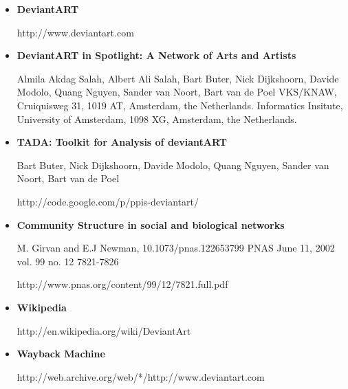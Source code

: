 \documentclass[12pt,a4paper]{report}
\begin{document}
\begin{itemize}

\item \textbf{DeviantART} 

http://www.deviantart.com 

\item \textbf{DeviantART in Spotlight: A Network of Arts and Artists }

Almila Akdag Salah, Albert Ali Salah, Bart Buter, Nick Dijkshoorn, Davide Modolo, Quang Nguyen, Sander van Noort, Bart van de Poel VKS/KNAW, Cruiquisweg 31, 1019 AT, Amsterdam, the Netherlands. Informatics Insitute, University of Amsterdam, 1098 XG, Amsterdam, the Netherlands.

\item \textbf{TADA: Toolkit for Analysis of deviantART}

Bart Buter, Nick Dijkshoorn, Davide Modolo, Quang Nguyen, Sander van Noort, Bart van de Poel 

http://code.google.com/p/ppis-deviantart/ 

\item \textbf{Community Structure in social and biological networks}

M. Girvan and E.J Newman, 10.1073/pnas.122653799 PNAS June 11, 2002 vol. 99 no. 12 7821-7826

http://www.pnas.org/content/99/12/7821.full.pdf

\item \textbf{Wikipedia} 

http://en.wikipedia.org/wiki/DeviantArt 

\item \textbf{Wayback Machine}

http://web.archive.org/web/*/http://www.deviantart.com 

\end{itemize}
\end{document}
